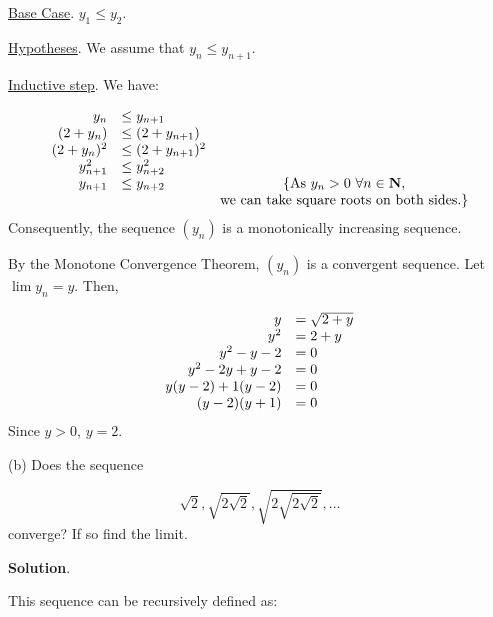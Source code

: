 \documentclass[10pt]{article}
\begin{document}
\underline{Base Case}. $\displaystyle y_{1} \leq y_{2}$.



\underline{Hypotheses}. We assume that $\displaystyle y_{n} \leq y_{n+1}$.



\underline{Inductive step}. We have:


\begin{equation*}
\begin{array}{ r l c }
y_{n} & \leq y_{n+1} & \\
( 2+y_{n}) & \leq ( 2+y_{n+1}) & \\
( 2+y_{n})^{2} & \leq ( 2+y_{n+1})^{2} & \\
y_{n+1}^{2} & \leq y_{n+2}^{2} & \\
y_{n+1} & \leq y_{n+2} & \{\text{As } y_{n}  >0\ \forall n\in \mathbf{N} ,\\
 &  & \text{we can take square roots on both sides.}\}
\end{array}
\end{equation*}
Consequently, the sequence $\displaystyle ( y_{n})$ is a monotonically increasing sequence.



By the Monotone Convergence Theorem, $\displaystyle ( y_{n})$ is a convergent sequence. Let $\displaystyle \lim y_{n} =y$. Then,


\begin{equation*}
\begin{array}{ r l }
y & =\sqrt{2+y}\\
y^{2} & =2+y\\
y^{2} -y-2 & =0\\
y^{2} -2y+y-2 & =0\\
y( y-2) +1( y-2) & =0\\
( y-2)( y+1) & =0
\end{array}
\end{equation*}
Since $\displaystyle y >0$, $\displaystyle y=2$.



(b) Does the sequence 


\begin{equation*}
\sqrt{2} ,\sqrt{2\sqrt{2}} ,\sqrt{2\sqrt{2\sqrt{2}}} ,\dotsc 
\end{equation*}
converge? If so find the limit.



\textbf{Solution}.



This sequence can be recursively defined as:
\end{document}

